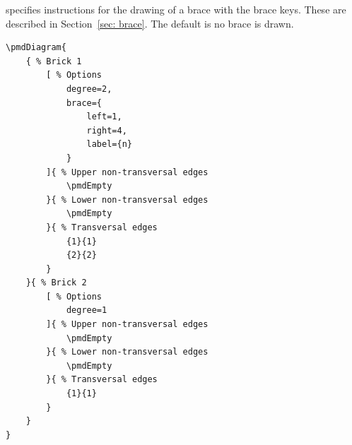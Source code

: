 \documentclass{ltxdoc}
\begin{document}
specifies instructions for the drawing of a brace with the brace keys. These are described in Section~\ref{sec: brace}. The default is no brace is drawn.
\begin{center}
    \begin{minipage}{\dimexpr0.85\textwidth-2\fboxrule-2\fboxsep\relax}
        \begin{minipage}[c]{0.4\linewidth}
\begin{verbatim}
\pmdDiagram{
    { % Brick 1
        [ % Options
            degree=2,
            brace={
                left=1,
                right=4,
                label={n}
            }
        ]{ % Upper non-transversal edges
            \pmdEmpty
        }{ % Lower non-transversal edges
            \pmdEmpty
        }{ % Transversal edges
            {1}{1}
            {2}{2}
        }
    }{ % Brick 2
        [ % Options
            degree=1
        ]{ % Upper non-transversal edges
            \pmdEmpty
        }{ % Lower non-transversal edges
            \pmdEmpty
        }{ % Transversal edges
            {1}{1}
        }
    }
}
\end{verbatim}
        \end{minipage}
        \hfill
        \begin{minipage}[c]{0.4\linewidth}
        \end{minipage}
    \end{minipage}%
\end{center}
\begin{center}
\end{center}
\end{document}
